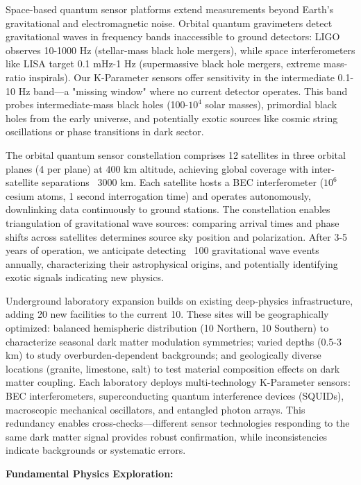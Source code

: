 \documentclass[11pt,a4paper,twoside]{article}
\begin{document}
Space-based quantum sensor platforms extend measurements beyond Earth's gravitational and electromagnetic noise. Orbital quantum gravimeters detect gravitational waves in frequency bands inaccessible to ground detectors: LIGO observes 10-1000 Hz (stellar-mass black hole mergers), while space interferometers like LISA target 0.1 mHz-1 Hz (supermassive black hole mergers, extreme mass-ratio inspirals). Our K-Parameter sensors offer sensitivity in the intermediate 0.1-10 Hz band—a "missing window" where no current detector operates. This band probes intermediate-mass black holes (100-$10^4$ solar masses), primordial black holes from the early universe, and potentially exotic sources like cosmic string oscillations or phase transitions in dark sector.

The orbital quantum sensor constellation comprises 12 satellites in three orbital planes (4 per plane) at 400 km altitude, achieving global coverage with inter-satellite separations ~3000 km. Each satellite hosts a BEC interferometer ($10^6$ cesium atoms, 1 second interrogation time) and operates autonomously, downlinking data continuously to ground stations. The constellation enables triangulation of gravitational wave sources: comparing arrival times and phase shifts across satellites determines source sky position and polarization. After 3-5 years of operation, we anticipate detecting ~100 gravitational wave events annually, characterizing their astrophysical origins, and potentially identifying exotic signals indicating new physics.

Underground laboratory expansion builds on existing deep-physics infrastructure, adding 20 new facilities to the current 10. These sites will be geographically optimized: balanced hemispheric distribution (10 Northern, 10 Southern) to characterize seasonal dark matter modulation symmetries; varied depths (0.5-3 km) to study overburden-dependent backgrounds; and geologically diverse locations (granite, limestone, salt) to test material composition effects on dark matter coupling. Each laboratory deploys multi-technology K-Parameter sensors: BEC interferometers, superconducting quantum interference devices (SQUIDs), macroscopic mechanical oscillators, and entangled photon arrays. This redundancy enables cross-checks—different sensor technologies responding to the same dark matter signal provides robust confirmation, while inconsistencies indicate backgrounds or systematic errors.

\textbf{Fundamental Physics Exploration:}
\end{document}
